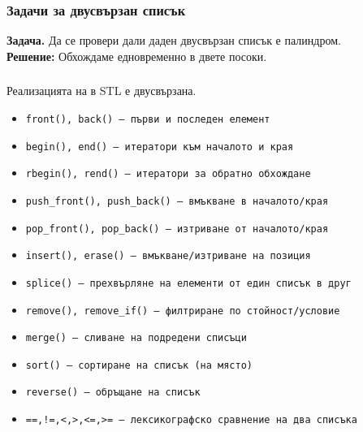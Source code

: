 \documentclass[alsotrans]{beamerswitch}
\begin{document}
\begin{frame}
  \frametitle{Задачи за двусвързан списък}

  \textbf{Задача.} Да се провери дали даден двусвързан списък е палиндром.\\[2ex]
  \pause
  \textbf{Решение:} Обхождаме едновременно в двете посоки.
\end{frame}

\begin{frame}
  \frametitle{}
  \small
  Реализацията на  в STL е двусвързана.
  \begin{itemize}
  \item \tt{front()}, \tt{back()} --- първи и последен елемент
  \item \tt{begin()}, \tt{end()} --- итератори към началото и края
  \item \tt{rbegin()}, \tt{rend()} --- итератори за обратно обхождане
  \item \tt{push\_front()}, \tt{push\_back()} --- вмъкване в началото/края
  \item \tt{pop\_front()}, \tt{pop\_back()} --- изтриване от началото/края
  \item \tt{insert()}, \tt{erase()} --- вмъкване/изтриване на позиция
  \item \tt{splice()} --- прехвърляне на елементи от един списък в друг
  \item \tt{remove()}, \tt{remove\_if()} --- филтриране по стойност/условие
  \item \tt{merge()} --- сливане на подредени списъци
  \item \tt{sort()} --- сортиране на списък (на място)
  \item \tt{reverse()} --- обръщане на списък
  \item \tt{==,!=,<,>,<=,>=} --- лексикографско сравнение на два списъка
  \end{itemize}
\end{frame}
\end{document}

